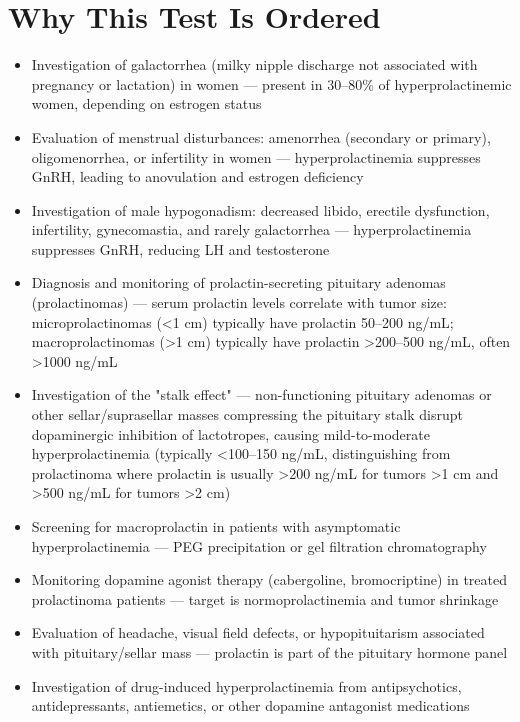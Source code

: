 \section*{Why This Test Is Ordered}
\begin{itemize}
  \item Investigation of galactorrhea (milky nipple discharge not associated with pregnancy or lactation) in women --- present in 30--80\% of hyperprolactinemic women, depending on estrogen status
  \item Evaluation of menstrual disturbances: amenorrhea (secondary or primary), oligomenorrhea, or infertility in women --- hyperprolactinemia suppresses GnRH, leading to anovulation and estrogen deficiency
  \item Investigation of male hypogonadism: decreased libido, erectile dysfunction, infertility, gynecomastia, and rarely galactorrhea --- hyperprolactinemia suppresses GnRH, reducing LH and testosterone
  \item Diagnosis and monitoring of prolactin-secreting pituitary adenomas (prolactinomas) --- serum prolactin levels correlate with tumor size: microprolactinomas (<1 cm) typically have prolactin 50--200 ng/mL; macroprolactinomas (>1 cm) typically have prolactin >200--500 ng/mL, often >1000 ng/mL
  \item Investigation of the "stalk effect" --- non-functioning pituitary adenomas or other sellar/suprasellar masses compressing the pituitary stalk disrupt dopaminergic inhibition of lactotropes, causing mild-to-moderate hyperprolactinemia (typically <100--150 ng/mL, distinguishing from prolactinoma where prolactin is usually >200 ng/mL for tumors >1 cm and >500 ng/mL for tumors >2 cm)
  \item Screening for macroprolactin in patients with asymptomatic hyperprolactinemia --- PEG precipitation or gel filtration chromatography
  \item Monitoring dopamine agonist therapy (cabergoline, bromocriptine) in treated prolactinoma patients --- target is normoprolactinemia and tumor shrinkage
  \item Evaluation of headache, visual field defects, or hypopituitarism associated with pituitary/sellar mass --- prolactin is part of the pituitary hormone panel
  \item Investigation of drug-induced hyperprolactinemia from antipsychotics, antidepressants, antiemetics, or other dopamine antagonist medications
\end{itemize}

